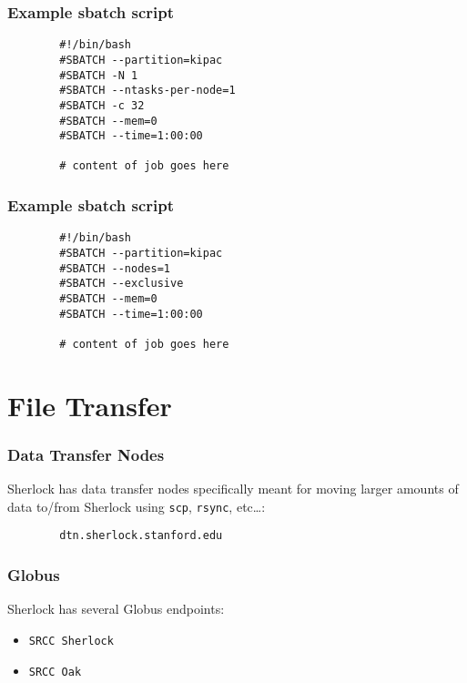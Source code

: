 \documentclass[aspectratio=169]{beamer}
\begin{document}
\begin{frame}[fragile]
	\frametitle{Example sbatch script}
	\begin{verbatim}
		#!/bin/bash
		#SBATCH --partition=kipac
		#SBATCH -N 1
		#SBATCH --ntasks-per-node=1
		#SBATCH -c 32
		#SBATCH --mem=0
		#SBATCH --time=1:00:00
		
		# content of job goes here
	\end{verbatim}
\end{frame}

\begin{frame}[fragile]
	\frametitle{Example sbatch script}
	\begin{verbatim}
		#!/bin/bash
		#SBATCH --partition=kipac
		#SBATCH --nodes=1
		#SBATCH --exclusive
		#SBATCH --mem=0
		#SBATCH --time=1:00:00
		
		# content of job goes here
	\end{verbatim}
\end{frame}



\section{File Transfer}

\frame{\sectionpage}

\begin{frame}[fragile]
	\frametitle{Data Transfer Nodes}
	Sherlock has data transfer nodes specifically meant for moving larger amounts of data to/from Sherlock using \texttt{scp}, \texttt{rsync}, etc\ldots:
	\begin{verbatim}
		dtn.sherlock.stanford.edu
	\end{verbatim}
\end{frame}

\begin{frame}
	\frametitle{Globus}
	Sherlock has several Globus endpoints:
	\begin{itemize}
		\item \texttt{SRCC Sherlock}
		\item \texttt{SRCC Oak}
	\end{itemize}
\end{frame}

\end{document}
